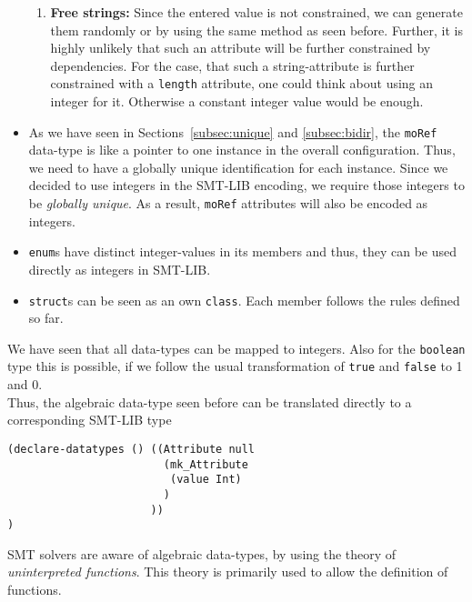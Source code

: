 \begin{itemize}
\begin{enumerate}
  \item \textbf{Free strings:} Since the entered value is not constrained, we can generate them randomly or by using the same method as seen before. Further, it is highly unlikely that such an attribute will be further constrained by dependencies. For the case, that such a string-attribute is further constrained with a \verb|length| attribute, one could think about using an integer for it. Otherwise a constant integer value would be enough.
\end{enumerate}


 \item As we have seen in Sections~\ref{subsec:unique} and \ref{subsec:bidir}, the \verb|moRef| data-type is like a pointer to one instance in the overall configuration. Thus, we need to have a globally unique identification for each instance. Since we decided to use integers in the SMT-LIB encoding, we require those integers to be \emph{globally unique}. As a result, \verb|moRef| attributes will also be encoded as integers.

 \item \verb|enum|s have distinct integer-values in its members and thus, they can be used directly as integers in SMT-LIB.\\


 \item \verb|struct|s can be seen as an own \verb|class|. Each member follows the rules defined so far.
\end{itemize}

We have seen that all data-types can be mapped to integers. Also for the \verb|boolean| type this is possible, if we follow the usual transformation of \verb|true| and \verb|false| to 1 and 0.\\

Thus, the algebraic data-type seen before can be translated directly to a corresponding SMT-LIB type
\begin{verbatim}
(declare-datatypes () ((Attribute null
                        (mk_Attribute     
                         (value Int)
                        )
                      ))
)
\end{verbatim}
SMT solvers are aware of algebraic data-types, by using the theory of \emph{uninterpreted functions}. This theory is primarily used to allow the definition of functions. 

